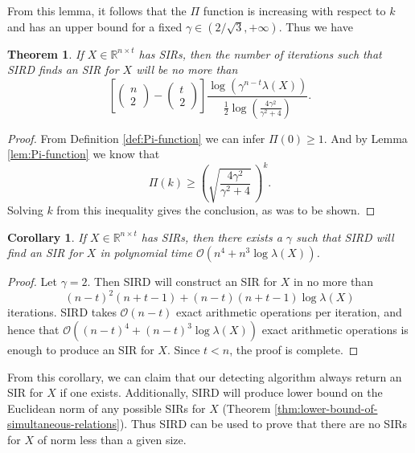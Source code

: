 \documentclass{sig-alternate}
\newtheorem{thm}[theorem]{Theorem}
\newtheorem{cor}[theorem]{Corollary}
\numberwithin{theorem}{section} \numberwithin{equation}{section}
\begin{document}
From this lemma, it follows that the $\Pi$ function is increasing
with respect to $k$ and has an upper bound for a fixed
$\gamma\in(2/\sqrt{3},+\infty)$. Thus we have

\begin{thm}\label{thm:the-number-of-iterations}
If $X\in\mathbb{R}^{n\times t}$ has SIRs, then the number of
iterations such that SIRD finds an SIR for $X$ will be no more than
\[
\left[\left(\begin{matrix}
              n \\
              2
            \end{matrix}
\right)-\left(\begin{matrix}
              t \\
              2
            \end{matrix}
\right)\right] \frac{\log(\gamma^{n-t}\lambda(X))}{\frac{1}{2}
\log\left(\frac{4\gamma^2}{\gamma^2+4}\right)}.
\]
\end{thm}

\begin{proof}
From Definition \ref{def:Pi-function} we can infer $\Pi(0)\geq 1$.
And by Lemma \ref{lem:Pi-function} we know that \[\Pi(k)\geq
\left(\sqrt{\frac{4\gamma^2}{\gamma^2+4}}\, \right)^k.\] Solving $k$
from this inequality gives the conclusion, as was to be shown.
\end{proof}


\begin{cor}\label{thm:time-complexity-of-simultaneous-relation}
If $X\in\mathbb{R}^{n\times t}$ has SIRs, then there exists a
$\gamma$ such that SIRD will find an SIR for $X$ in polynomial time
$\mathcal{O}(n^4+n^3\log\lambda(X))$.
\end{cor}

\begin{proof}
Let $\gamma = 2$. Then SIRD will construct an SIR for $X$  in no
more than
\[
(n-t)^2(n+t-1)+(n-t)(n+t-1)\log\lambda(X)
\]
iterations. SIRD takes $\mathcal{O}(n-t)$ exact arithmetic
operations per iteration, and hence that
$\mathcal{O}((n-t)^4+(n-t)^3\log\lambda(X))$ exact arithmetic
operations is enough to produce an SIR for $X$. Since $t<n$, the
proof is complete.
\end{proof}

\begin{rem}\label{rem:simultaneous-relation-algorithm}
From this corollary, we can claim that our detecting algorithm
always return an SIR for $X$ if one exists. Additionally, SIRD will
produce lower bound on the Euclidean norm of any possible SIRs for
$X$ (Theorem \ref{thm:lower-bound-of-simultaneous-relations}). Thus
SIRD can be used to prove that there are no SIRs for $X$ of norm
less than a given size.
\end{rem}
\end{document}
